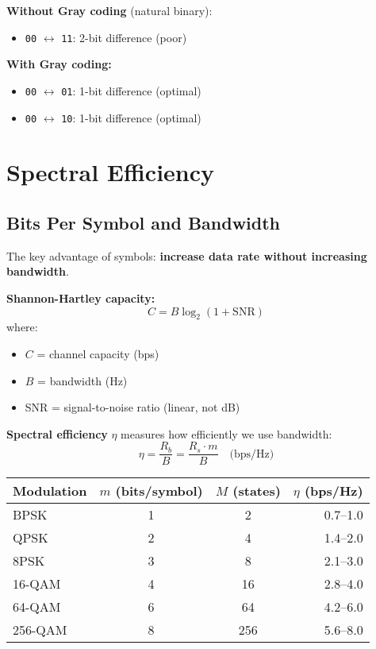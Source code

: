 \textbf{Without Gray coding} (natural binary):
\begin{itemize}
\item \texttt{00} $\leftrightarrow$ \texttt{11}: 2-bit difference (poor)
\end{itemize}

\textbf{With Gray coding:}
\begin{itemize}
\item \texttt{00} $\leftrightarrow$ \texttt{01}: 1-bit difference (optimal)
\item \texttt{00} $\leftrightarrow$ \texttt{10}: 1-bit difference (optimal)
\end{itemize}

\section{Spectral Efficiency}

\subsection{Bits Per Symbol and Bandwidth}

The key advantage of symbols: \textbf{increase data rate without increasing bandwidth}.

\textbf{Shannon-Hartley capacity:}
\begin{equation}
C = B \log_2(1 + \text{SNR})
\end{equation}
where:
\begin{itemize}
\item $C$ = channel capacity (bps)
\item $B$ = bandwidth (Hz)
\item SNR = signal-to-noise ratio (linear, not dB)
\end{itemize}

\textbf{Spectral efficiency} $\eta$ measures how efficiently we use bandwidth:
\begin{equation}
\eta = \frac{R_b}{B} = \frac{R_s \cdot m}{B} \quad \text{(bps/Hz)}
\end{equation}

\begin{center}
\begin{tabular}{@{}lccr@{}}
\toprule
Modulation & $m$ (bits/symbol) & $M$ (states) & $\eta$ (bps/Hz) \\
\midrule
BPSK & 1 & 2 & 0.7--1.0 \\
QPSK & 2 & 4 & 1.4--2.0 \\
8PSK & 3 & 8 & 2.1--3.0 \\
16-QAM & 4 & 16 & 2.8--4.0 \\
64-QAM & 6 & 64 & 4.2--6.0 \\
256-QAM & 8 & 256 & 5.6--8.0 \\
\bottomrule
\end{tabular}
\end{center}

